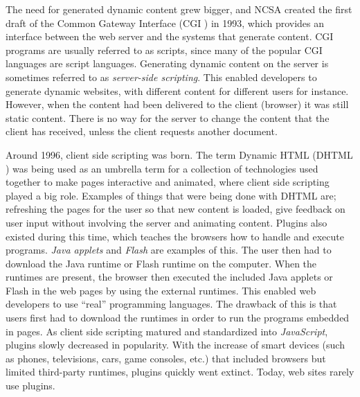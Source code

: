 \documentclass[a4paper,11pt]{kth-mag}
\newcommand\abbr[2][]{\uppercase{#2}\ifthenelse{\equal{#1}{}}%
                     {}{#1}}
\begin{document}
        The need for generated dynamic content grew bigger, and \abbr{ncsa} created the first draft of the Common Gateway Interface (\abbr{cgi}) in 1993, which provides an interface between the web server and the systems that generate content.
        \abbr{cgi} programs are usually referred to as scripts, since many of the popular \abbr{cgi} languages are script languages.
        Generating dynamic content on the server is sometimes referred to as \emph{server-side scripting}.
        This enabled developers to generate dynamic websites, with different content for different users for instance.
        However, when the content had been delivered to the client (browser) it was still static content.
        There is no way for the server to change the content that the client has received, unless the client requests another document.

        Around 1996, client side scripting was born.
        The term Dynamic \abbr{html} (\abbr{dhtml}) was being used as an umbrella term for a collection of technologies used together to make pages interactive and animated, where client side scripting played a big role.
        Examples of things that were being done with \abbr{dhtml} are; refreshing the pages for the user so that new content is loaded, give feedback on user input without involving the server and animating content.
        Plugins also existed during this time, which teaches the browsers how to handle and execute programs.
        \emph{Java applets} and \emph{Flash} are examples of this. 
        The user then had to download the Java runtime or Flash runtime on the computer.
        When the runtimes are present, the browser then executed the included Java applets or Flash in the web pages by using the external runtimes.
        This enabled web developers to use ``real'' programming languages.
        The drawback of this is that users first had to download the runtimes in order to run the programs embedded in pages.
        As client side scripting matured and standardized into \emph{JavaScript}, plugins slowly decreased in popularity.
        With the increase of smart devices (such as phones, televisions, cars, game consoles, etc.) that included browsers but limited third-party runtimes, plugins quickly went extinct.
        Today, web sites rarely use plugins.
\end{document}
